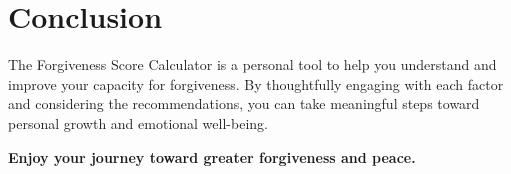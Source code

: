 \documentclass[11pt]{article}
\begin{document}
\section*{Conclusion}

The Forgiveness Score Calculator is a personal tool to help you understand and improve your capacity for forgiveness. By thoughtfully engaging with each factor and considering the recommendations, you can take meaningful steps toward personal growth and emotional well-being.

\bigskip

\textbf{Enjoy your journey toward greater forgiveness and peace.}
\end{document}
